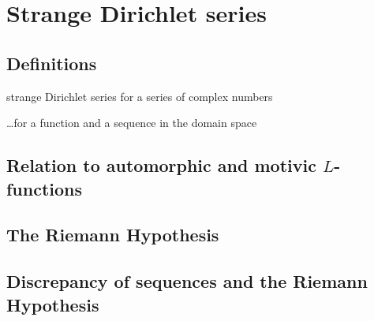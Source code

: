 
\chapter{Strange Dirichlet series}





\section{Definitions}

strange Dirichlet series for a series of complex numbers

\ldots for a function and a sequence in the domain space





\section{Relation to automorphic and motivic \texorpdfstring{$L$}{L}-functions}





\section{The Riemann Hypothesis}





\section{Discrepancy of sequences and the Riemann Hypothesis}
